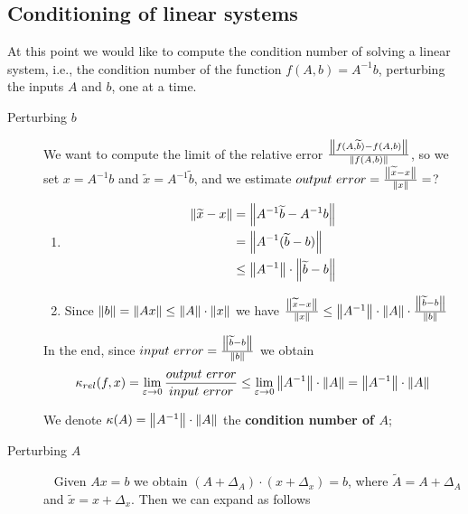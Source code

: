 \documentclass[computationalMathematics.tex]{subfiles}
\begin{document}
\subsection{Conditioning of linear systems}
At this point we would like to compute the condition number of solving a linear system, i.e., the condition number of the function $f(A,b)=A^{-1}b$, perturbing the inputs $A$ and $b$, one at a time.

\begin{description}
  \item[{\sc Perturbing} $b$] We want to compute the limit of the relative error $\frac{\left\lVert f(A, \widetilde{b}) - f(A, b)\right\rVert}{\left\lVert f(A, b)\right\rVert}$, so we set $x=A^{-1}b$ and $\tilde{x}=A^{-1}\tilde{b}$, and we estimate $output ~ error = \frac{\left\lVert\widetilde{x}-x\right\rVert}{\left\lVert x\right\rVert} =$?
    \begin{enumerate}
        \item \begin{equation}
          \begin{aligned}
            \left\lVert\widetilde{x} - x\right\rVert &= \left\lVert{A}^{-1} \widetilde{b} - {A}^{-1} b\right\rVert\\
            &= \left\lVert{A}^{-1} (\widetilde{b} - b)\right\rVert\\
            &\le \left\lVert{A}^{-1}\right\rVert \cdot \left\lVert\widetilde{b} - b\right\rVert\\
          \end{aligned}
          \end{equation}
        \item Since $\left\lVert b\right\rVert = \left\lVert Ax\right\rVert \le \left\lVert A\right\rVert \cdot \left\lVert x\right\rVert$ we have
          $\frac{\left\lVert\widetilde{x} - x\right\rVert}{\left\lVert x\right\rVert} \le \left\lVert{A}^{-1}\right\rVert \cdot \left\lVert A\right\rVert \cdot \frac{\left\lVert\widetilde{b} - b\right\rVert}{\left\lVert b\right\rVert}$
    \end{enumerate}
    In the end, since $input ~ error = \frac{\left\lVert\widetilde{b} - b\right\rVert}{\left\lVert b\right\rVert}$ we obtain 
    \[
      \kappa_{rel} (f, x) = \lim\limits_{\varepsilon \rightarrow 0} \frac{output ~ error}{input ~ error} \le \lim\limits_{\varepsilon \rightarrow 0} \left\lVert{A}^{-1}\right\rVert \cdot \left\lVert A\right\rVert = \left\lVert{A}^{-1}\right\rVert \cdot \left\lVert A\right\rVert
    \]
    
    We denote $\kappa(A) = \left\lVert{A}^{-1}\right\rVert \cdot \left\lVert A\right\rVert$ the \textbf{condition number of $A$};

  \item[{\sc Perturbing} $A$]~%
    Given $Ax=b$ we obtain $(A+\Delta_A) \cdot (x + \Delta_x)= b$, where $\widetilde{A} = A + \Delta_A$ and $\widetilde{x} = x + \Delta_x$. Then we can expand as follows


\end{description}
\end{document}

